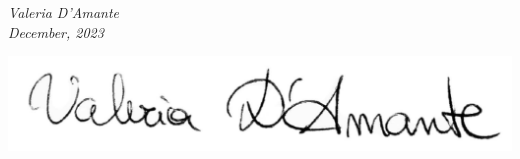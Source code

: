 \documentclass[fontsize=12pt]{article} %
\newcommand{\NewPart}[1]{\section*{\uppercase{#1}}}
\newcommand{\EducationEntry}[4]{
	\noindent \textbf{#1} \hfill      %
	{#2} \par  %
	\noindent \textit{#3} \par        %
	\noindent\hangindent=2em\hangafter=0 \small #4 %
	\normalsize \par}
\begin{document}
\begin{flushright}
                \textit{Valeria D'Amante}   \\
                \textit{December, 2023}\\ \vspace{5mm}

                \includegraphics[scale=0.25]{firmavd.png}
            \end{flushright}


	\newpage


\end{document}

